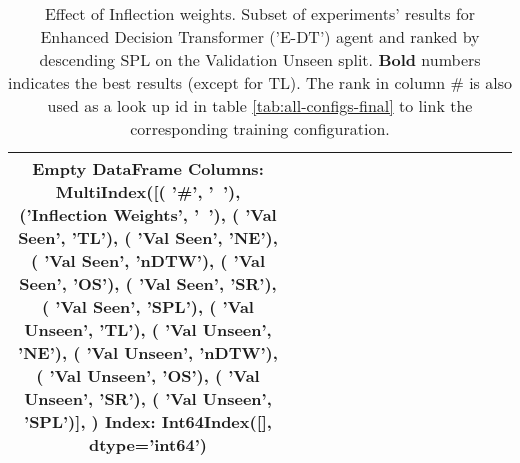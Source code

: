 \begin{table}
\centering
\caption{\label{tab:e_dt_inflection_weights}Effect of Inflection weights. Subset of experiments' results for Enhanced Decision Transformer ('E-DT') agent and ranked by descending SPL on the Validation Unseen split. \textbf{Bold} numbers indicates the best results (except for TL). The rank in column \# is also used as a look up id in table \ref{tab:all-configs-final} to link the corresponding training configuration.}
\begin{tabular}{@{\hskip3pt}c@{\hskip3pt}c@{\hskip3pt}c@{\hskip3pt}c@{\hskip3pt}c@{\hskip3pt}c@{\hskip3pt}c@{\hskip3pt}c@{\hskip3pt}c@{\hskip3pt}c@{\hskip3pt}c@{\hskip3pt}c@{\hskip3pt}c@{\hskip3pt}c@{\hskip3pt}c}
\toprule
Empty DataFrame
Columns: MultiIndex([(                '\textbf{\#}',    '\textbf{~}'),
            ('\textbf{Inflection Weights}',    '\textbf{~}'),
            (          '\textbf{Val Seen}',   '\textbf{TL}'),
            (          '\textbf{Val Seen}',   '\textbf{NE}'),
            (          '\textbf{Val Seen}', '\textbf{nDTW}'),
            (          '\textbf{Val Seen}',   '\textbf{OS}'),
            (          '\textbf{Val Seen}',   '\textbf{SR}'),
            (          '\textbf{Val Seen}',  '\textbf{SPL}'),
            (        '\textbf{Val Unseen}',   '\textbf{TL}'),
            (        '\textbf{Val Unseen}',   '\textbf{NE}'),
            (        '\textbf{Val Unseen}', '\textbf{nDTW}'),
            (        '\textbf{Val Unseen}',   '\textbf{OS}'),
            (        '\textbf{Val Unseen}',   '\textbf{SR}'),
            (        '\textbf{Val Unseen}',  '\textbf{SPL}')],
           )
Index: Int64Index([], dtype='int64') \\
\bottomrule
\end{tabular}
\end{table}
